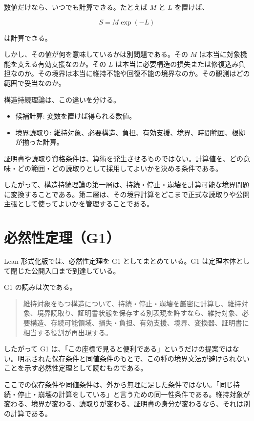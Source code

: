 \documentclass[12pt,a4paper]{article}
\begin{document}
数値だけなら、いつでも計算できる。たとえば $M$ と $L$ を置けば、

\[
S = M \exp(-L)
\]

は計算できる。

しかし、その値が何を意味しているかは別問題である。その $M$ は本当に対象機能を支える有効支援なのか。その $L$ は本当に必要構造の損失または修復込み負担なのか。その境界は本当に維持不能や回復不能の境界なのか。その観測はどの範囲で妥当なのか。

構造持続理論は、この違いを分ける。

\begin{itemize}
\tightlist
\item
  候補計算: 変数を置けば得られる数値。
\item
  境界読取り: 維持対象、必要構造、負担、有効支援、境界、時間範囲、根拠が揃った計算。
\end{itemize}

証明書や読取り資格条件は、算術を発生させるものではない。計算値を、どの意味・どの範囲・どの読取りとして採用してよいかを決める条件である。

したがって、構造持続理論の第一層は、持続・停止・崩壊を計算可能な境界問題に変換することである。第二層は、その境界計算をどこまで正式な読取りや公開主張として使ってよいかを管理することである。

\section{必然性定理（G1）}\label{ux5fc5ux7136ux6027ux5b9aux7406g1}

Lean 形式化版では、必然性定理を G1 としてまとめている。G1 は定理本体として閉じた公開入口まで到達している。

G1 の読みは次である。

\begin{quote}
維持対象をもつ構造について、持続・停止・崩壊を厳密に計算し、維持対象、境界読取り、証明書状態を保存する別表現を許すなら、維持対象、必要構造、存続可能領域、損失・負担、有効支援、境界、変換器、証明書に相当する役割が再出現する。
\end{quote}

したがって G1 は、「この座標で見ると便利である」というだけの提案ではない。明示された保存条件と同値条件のもとで、この種の境界文法が避けられないことを示す必然性定理として読むものである。

ここでの保存条件や同値条件は、外から無理に足した条件ではない。「同じ持続・停止・崩壊の計算をしている」と言うための同一性条件である。維持対象が変わる、境界が変わる、読取りが変わる、証明書の身分が変わるなら、それは別の計算である。
\end{document}
